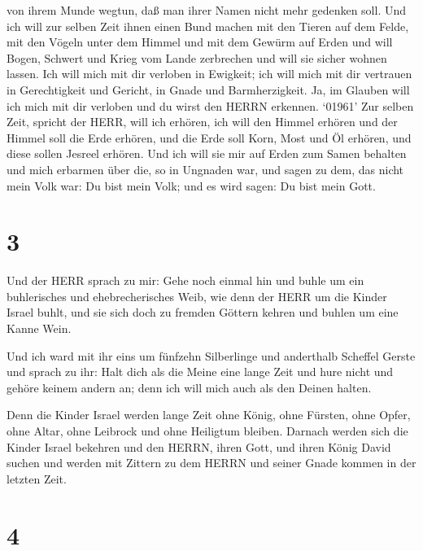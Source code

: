 von ihrem Munde wegtun, daß man ihrer Namen nicht mehr gedenken soll.
 Und ich will zur selben Zeit ihnen einen Bund machen mit
den Tieren auf dem Felde, mit den Vögeln unter dem Himmel und mit dem
Gewürm auf Erden und will Bogen, Schwert und Krieg vom Lande zerbrechen
und will sie sicher wohnen lassen.  Ich will mich mit dir
verloben in Ewigkeit; ich will mich mit dir vertrauen in Gerechtigkeit
und Gericht, in Gnade und Barmherzigkeit.  Ja, im Glauben
will ich mich mit dir verloben und du wirst den HERRN erkennen.
 `01961' Zur selben Zeit, spricht der HERR, will ich
erhören, ich will den Himmel erhören und der Himmel soll die Erde
erhören,  und die Erde soll Korn, Most und Öl erhören, und
diese sollen Jesreel erhören.  Und ich will sie mir auf
Erden zum Samen behalten und mich erbarmen über die, so in Ungnaden war,
und sagen zu dem, das nicht mein Volk war: Du bist mein Volk; und es
wird sagen: Du bist mein Gott.

\hypertarget{section-2}{%
\section{3}\label{section-2}}

 Und der HERR sprach zu mir: Gehe noch einmal hin und buhle
um ein buhlerisches und ehebrecherisches Weib, wie denn der HERR um die
Kinder Israel buhlt, und sie sich doch zu fremden Göttern kehren und
buhlen um eine Kanne Wein.

 Und ich ward mit ihr eins um fünfzehn Silberlinge und
anderthalb Scheffel Gerste  und sprach zu ihr: Halt dich als
die Meine eine lange Zeit und hure nicht und gehöre keinem andern an;
denn ich will mich auch als den Deinen halten.

 Denn die Kinder Israel werden lange Zeit ohne König, ohne
Fürsten, ohne Opfer, ohne Altar, ohne Leibrock und ohne Heiligtum
bleiben.  Darnach werden sich die Kinder Israel bekehren und
den HERRN, ihren Gott, und ihren König David suchen und werden mit
Zittern zu dem HERRN und seiner Gnade kommen in der letzten Zeit.

\hypertarget{section-3}{%
\section{4}\label{section-3}}

